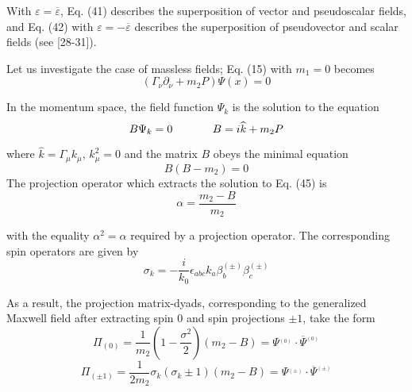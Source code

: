 \documentclass[a4paper,12pt]{article}
\begin{document}
With $\varepsilon =\overline{\varepsilon }$, Eq. (41) describes
the superposition of vector and pseudoscalar fields, and Eq. (42)
with $ \varepsilon =-\overline{\varepsilon }$ describes the
superposition of pseudovector and scalar fields (see [28-31]).

Let us investigate the case of massless fields; Eq. (15) with $m_1=0$
becomes
\begin{equation}
\left( \Gamma _\nu \partial _\nu +m_2P\right) \Psi (x)=0  \label{44}
\end{equation}

In the momentum space, the field function $\Psi _k$ is the solution to the
equation
\begin{equation}
B\Psi _k=0\hspace{0.5in}B=i\widehat{k}+m_2P  \label{45}
\end{equation}

where $\widehat{k}=\Gamma _\mu k_\mu $, $k_\mu ^2=0$ and the matrix $B$
obeys the minimal equation
\begin{equation}
B\left( B-m_2\right) =0  \label{46}
\end{equation}
The projection operator which extracts the solution to Eq. (45) is
\begin{equation}
\alpha =\frac{m_2-B}{m_2}  \label{47}
\end{equation}

with the equality $\alpha ^2=\alpha $ required by a projection operator. The
corresponding spin operators are given by
\begin{equation}
\sigma _k=-\frac i{k_0}\epsilon _{abc}k_a\beta _b^{(\pm )}\beta _c^{(\pm )}
\label{48}
\end{equation}

As a result, the projection matrix-dyads, corresponding to the generalized
Maxwell field after extracting spin $0$ and spin projections $\pm 1$, take
the form
\[
\Pi _{(0)}=\frac 1{m_2}\left( 1-\frac{\sigma ^2}2\right) \left( m_2-B\right)
=\Psi ^{_{(0)}}\cdot \overline{\Psi }^{_{(0)}}
\]
\begin{equation}
\Pi _{(\pm 1)}=\frac 1{2m_2}\sigma _k\left( \sigma _k\pm 1\right) \left(
m_2-B\right) =\Psi ^{_{(\pm )}}\cdot \overline{\Psi }^{_{(\pm )}}  \label{49}
\end{equation}
\end{document}
